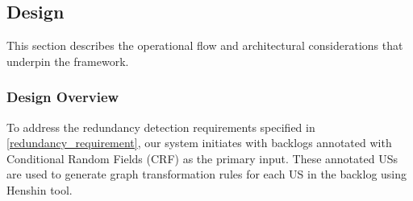 
\subsection{Design}\label{desing}

This section describes the operational flow and architectural considerations that underpin the framework.

\subsubsection*{Design Overview}
To address the redundancy detection requirements specified in \ref{redundancy_requirement}, our system initiates with backlogs annotated with Conditional Random Fields (CRF) as the primary input. These annotated USs are used to generate graph transformation rules for each US in the backlog using Henshin tool.

